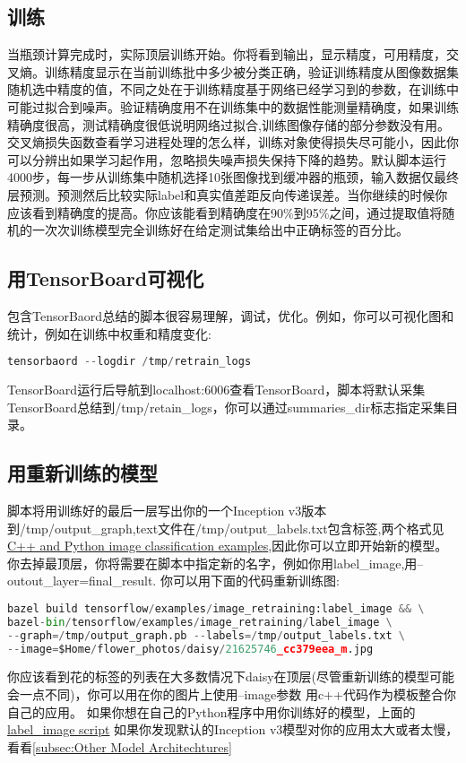 \subsection{训练}
当瓶颈计算完成时，实际顶层训练开始。你将看到输出，显示精度，可用精度，交叉熵。训练精度显示在当前训练批中多少被分类正确，验证训练精度从图像数据集随机选中精度的值，不同之处在于训练精度基于网络已经学习到的参数，在训练中可能过拟合到噪声。验证精确度用不在训练集中的数据性能测量精确度，如果训练精确度很高，测试精确度很低说明网络过拟合,训练图像存储的部分参数没有用。交叉熵损失函数查看学习进程处理的怎么样，训练对象使得损失尽可能小，因此你可以分辨出如果学习起作用，忽略损失噪声损失保持下降的趋势。默认脚本运行4000步，每一步从训练集中随机选择10张图像找到缓冲器的瓶颈，输入数据仅最终层预测。预测然后比较实际label和真实值差距反向传递误差。当你继续的时候你应该看到精确度的提高。你应该能看到精确度在90\%到95\%之间，通过提取值将随机的一次次训练模型完全训练好在给定测试集给出中正确标签的百分比。
\subsection{用TensorBoard可视化}
包含TensorBaord总结的脚本很容易理解，调试，优化。例如，你可以可视化图和统计，例如在训练中权重和精度变化:
\begin{lstlisting}[language=Python]
tensorbaord --logdir /tmp/retrain_logs
\end{lstlisting}
TensorBoard运行后导航到localhost:6006查看TensorBoard，脚本将默认采集TensorBoard总结到/tmp/retain\_logs，你可以通过summaries\_dir标志指定采集目录。
\subsection{用重新训练的模型}
脚本将用训练好的最后一层写出你的一个Inception v3版本到/tmp/output\_graph,text文件在/tmp/output\_labels.txt包含标签,两个格式见
\href{https://www.tensorflow.org/tutorials/image_recognition}{C++ and Python image classification examples},因此你可以立即开始新的模型。你去掉最顶层，你将需要在脚本中指定新的名字，例如你用label\_image,用--outout\_layer=final\_result.
你可以用下面的代码重新训练图:
\begin{lstlisting}[language=Python]
bazel build tensorflow/examples/image_retraining:label_image && \
bazel-bin/tensorflow/examples/image_retraining/label_image \
--graph=/tmp/output_graph.pb --labels=/tmp/output_labels.txt \
--image=$Home/flower_photos/daisy/21625746_cc379eea_m.jpg
\end{lstlisting}
你应该看到花的标签的列表在大多数情况下daisy在顶层(尽管重新训练的模型可能会一点不同)，你可以用在你的图片上使用--image参数
用c++代码作为模板整合你自己的应用。
如果你想在自己的Python程序中用你训练好的模型，上面的\href{https://www.github.com/tensorflow/tensorflow/blob/r1.3/tensorflow/examples/image_retraining/label_image.py}{label\_image script}
如果你发现默认的Inception v3模型对你的应用太大或者太慢，看看\ref{subsec:Other Model Architechtures}
